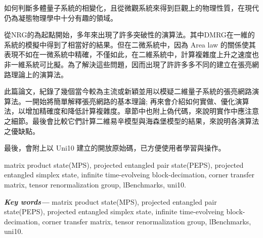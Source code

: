\providecommand{\keywords}[1]{\textbf{\textit{Key words---}} #1}

\begin{abstractzh}
如何判斷多體量子系統的相變化，且從微觀系統來得到巨觀上的物理性質，在現代仍為凝態物理學中十分有趣的領域。

從NRG的為起點開始，多年來出現了許多突破性的演算法。其中DMRG在一維的系統的模擬中得到了相當好的結果。但在二微系統中，因為 Area law 的關係使其表現不如在一微系統中精確，不僅如此，在二維系統中，計算複雜度上升之速度也非一維系統可比擬。為了解決這些問題，因而出現了許許多多不同的建立在張亮網路理論上的演算法。

此篇論文，紀錄了幾個當今較為主流或新穎並用以模疑二維量子系統的張亮網路演算法。一開始將簡單解釋張亮網路的基本理論; 再來會介紹如何實做、優化演算法，以增加精確度和降低計算複雜度。章節中也附上偽代碼，來說明實作中應注意之細節。最後會比較它們計算二維易辛模型與海森堡模型的結果，來說明各演算法之優缺點。

最後，會附上以 Uni10 建立的開放原始碼，已方便使用者學習與操作。
\end{abstractzh}

\begin{abstracten}
matrix product state(MPS), projected entangled pair state(PEPS), projected entangled simplex state, infinite time-evolveing block-decimation, corner transfer matrix, tensor renormalization group, lBenchmarks, uni10.
\end{abstracten}

\keywords{matrix product state(MPS), projected entangled pair state(PEPS), projected entangled simplex state, infinite time-evolveing block-decimation, corner transfer matrix, tensor renormalization group, lBenchmarks, uni10.}

\begin{comment}
\category{I2.10}{Computing Methodologies}{Artificial Intelligence --
Vision and Scene Understanding} \category{H5.3}{Information
Systems}{Information Interfaces and Presentation (HCI) -- Web-based
Interaction.}

\terms{Design, Human factors, Performance.}
\end{comment}
